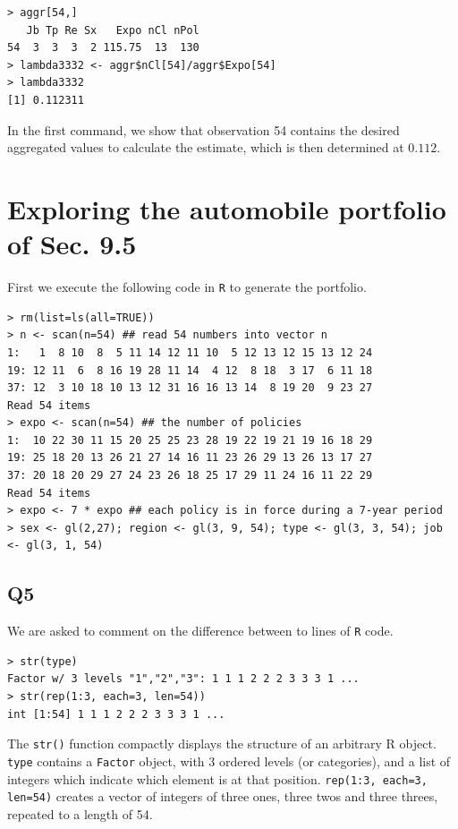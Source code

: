 \documentclass[11pt]{article}
\begin{document}
\begin{verbatim}
> aggr[54,]
   Jb Tp Re Sx   Expo nCl nPol
54  3  3  3  2 115.75  13  130
> lambda3332 <- aggr$nCl[54]/aggr$Expo[54]
> lambda3332
[1] 0.112311
\end{verbatim}

In the first command, we show that observation 54 contains the desired aggregated values to calculate the estimate, which is then determined at $0.112$.

\section{Exploring the automobile portfolio of Sec. 9.5}

First we execute the following code in \verb|R| to generate the portfolio.

\begin{verbatim}
> rm(list=ls(all=TRUE)) 
> n <- scan(n=54) ## read 54 numbers into vector n
1:   1  8 10  8  5 11 14 12 11 10  5 12 13 12 15 13 12 24
19: 12 11  6  8 16 19 28 11 14  4 12  8 18  3 17  6 11 18
37: 12  3 10 18 10 13 12 31 16 16 13 14  8 19 20  9 23 27
Read 54 items
> expo <- scan(n=54) ## the number of policies 
1:  10 22 30 11 15 20 25 25 23 28 19 22 19 21 19 16 18 29
19: 25 18 20 13 26 21 27 14 16 11 23 26 29 13 26 13 17 27
37: 20 18 20 29 27 24 23 26 18 25 17 29 11 24 16 11 22 29
Read 54 items
> expo <- 7 * expo ## each policy is in force during a 7-year period
> sex <- gl(2,27); region <- gl(3, 9, 54); type <- gl(3, 3, 54); job <- gl(3, 1, 54)
\end{verbatim}

\subsection*{Q5}

We are asked to comment on the difference between to lines of \verb|R| code.

\begin{verbatim}
> str(type)
Factor w/ 3 levels "1","2","3": 1 1 1 2 2 2 3 3 3 1 ...
> str(rep(1:3, each=3, len=54))
int [1:54] 1 1 1 2 2 2 3 3 3 1 ...
\end{verbatim}

The \verb|str()| function compactly displays the structure of an arbitrary R object.
\verb|type| contains a \verb|Factor| object, with 3 ordered levels (or categories), and a list of integers which indicate which element is at that position.
\verb|rep(1:3, each=3, len=54)| creates a vector of integers of three ones, three twos and three threes, repeated to a length of 54.
\end{document}
